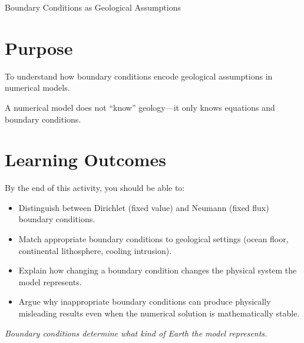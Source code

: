 \usetikzlibrary{decorations.markings,calc}
\begin{activity}{Boundary Conditions as Geological Assumptions}

\section*{Purpose}
To understand how boundary conditions encode geological assumptions in numerical
models.

A numerical model does not ``know'' geology—it only knows equations and boundary
conditions.

\section*{Learning Outcomes}

By the end of this activity, you should be able to:
\begin{itemize}
    \item Distinguish between Dirichlet (fixed value) and Neumann (fixed flux) boundary conditions.
    \item Match appropriate boundary conditions to geological settings (ocean floor, continental lithosphere, cooling intrusion).
    \item Explain how changing a boundary condition changes the physical system the model represents.
    \item Argue why inappropriate boundary conditions can produce physically misleading results even when the numerical solution is mathematically stable.
\end{itemize}

\emph{Boundary conditions determine what kind of Earth the model represents.}

\end{activity}
